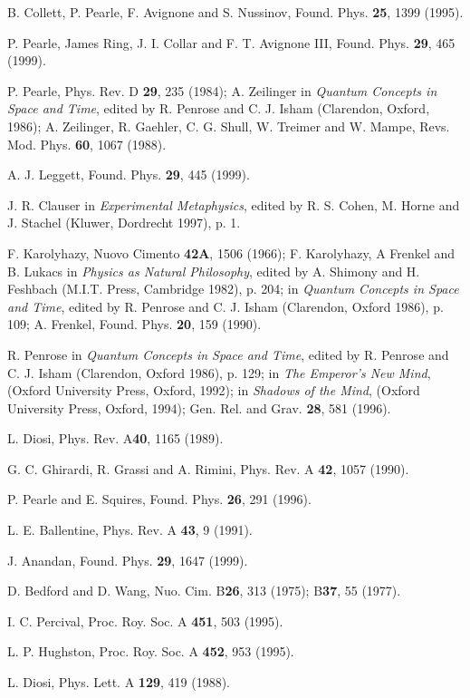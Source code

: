 \documentclass{article}
\begin{document}
\begin{thebibliography}{99}
 B. Collett, P. Pearle, F. Avignone and S. Nussinov, Found. Phys. {\bf 25}, 1399 (1995).     

P. Pearle, James Ring, J. I. Collar and F. T.  Avignone III,
 Found. Phys. {\bf 29}, 465 (1999).

P. Pearle, Phys. Rev. D {\bf 29}, 235 (1984); A. Zeilinger in {\it Quantum Concepts 
in Space and Time}, edited by R. Penrose and C. J. 
Isham (Clarendon, Oxford, 1986); A. Zeilinger, R. Gaehler,
 C. G. Shull, W. Treimer and W. Mampe,  Revs. Mod. Phys. {\bf 60}, 1067 (1988). 

A. J.  Leggett, Found. Phys. {\bf 29}, 445 (1999).

J. R. Clauser in {\it Experimental Metaphysics}, edited by R. S. Cohen, 
M. Horne and J. Stachel (Kluwer, Dordrecht 1997), p. 1.

F. Karolyhazy, Nuovo Cimento {\bf42A}, 1506 (1966); 
F. Karolyhazy, A Frenkel and B. Lukacs in 
{\it Physics as Natural Philosophy}, edited by A. 
Shimony and H. Feshbach (M.I.T. Press, Cambridge 1982), p. 204; 
in {\it Quantum Concepts in Space and Time}, edited by R. Penrose and 
C. J. Isham (Clarendon, Oxford 1986), p. 109; A. Frenkel, Found. Phys. {\bf 20}, 159 (1990).

R. Penrose in {\it Quantum Concepts in Space and Time}, 
edited by R. Penrose and C. J. Isham (Clarendon, Oxford 1986), p. 129;  
in {\it The Emperor's New Mind}, (Oxford University Press, Oxford, 1992); in {\it 
Shadows of the Mind}, (Oxford University Press, Oxford, 1994); Gen. Rel. and Grav. {\bf 28}, 581 (1996).

L. Diosi, Phys. Rev. A{\bf 40}, 1165 (1989).

G. C. Ghirardi, R. Grassi and A. Rimini, Phys. Rev. A {\bf 42}, 1057 (1990).

P. Pearle and E. Squires, Found. Phys. {\bf 26}, 291 (1996).

L. E. Ballentine, Phys. Rev. A {\bf 43}, 9 (1991).

J. Anandan, Found. Phys. {\bf 29}, 1647 (1999).

D. Bedford and D. Wang, Nuo. Cim. B{\bf 26}, 313 (1975);  B{\bf 37}, 55 (1977). 

I. C. Percival, Proc. Roy. Soc. A {\bf 451}, 503 (1995).

L. P. Hughston, Proc. Roy. Soc. A {\bf 452}, 953 (1995).

L. Diosi, Phys. Lett. A  {\bf 129}, 419 (1988).

\end{thebibliography}
\end{document}
